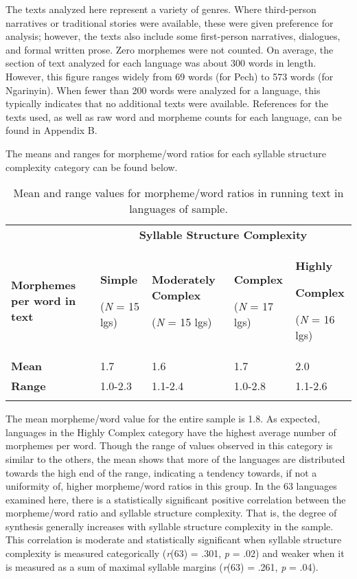   The texts analyzed here represent a variety of genres. Where third-person narratives or traditional stories were available, these were given preference for analysis; however, the texts also include some first-person narratives, dialogues, and formal written prose. Zero morphemes were not counted. On average, the section of text analyzed for each language was about 300 words in length. However, this figure ranges widely from 69 words (for Pech) to 573 words (for Ngarinyin). When fewer than 200 words were analyzed for a language, this typically indicates that no additional texts were available. References for the texts used, as well as raw word and morpheme counts for each language, can be found in Appendix B.

  The means and ranges for morpheme/word ratios for each syllable structure complexity category can be found below.

\begin{table}
\begin{tabularx}{\textwidth}{XXXXX}
\lsptoprule
 & \multicolumn{4}{c}{ \textbf{Syllable Structure Complexity}}\\
 \textbf{Morphemes per word in text} & { \textbf{Simple}}

 (\textit{N} = 15 lgs) & { \textbf{Moderately Complex}}

 (\textit{N} = 15 lgs) & { \textbf{Complex}}

 (\textit{N} = 17 lgs) & { \textbf{Highly} }

{ \textbf{Complex}}

 (\textit{N} = 16 lgs)\\
 \textbf{Mean} & 1.7 & 1.6 & 1.7 & 2.0\\
 \textbf{Range} & 1.0-2.3 & 1.1-2.4 & 1.0-2.8 & 1.1-2.6\\
\lspbottomrule
\end{tabularx}
\caption{\label{tab:8.1}Mean and range values for morpheme/word ratios in running text in languages of sample.}
\end{table}

  The mean morpheme/word value for the entire sample is 1.8. As expected, languages in the Highly Complex category have the highest average number of morphemes per word. Though the range of values observed in this category is similar to the others, the mean shows that more of the languages are distributed towards the high end of the range, indicating a tendency towards, if not a uniformity of, higher morpheme/word ratios in this group. In the 63 languages examined here, there is a statistically significant positive correlation between the morpheme/word ratio and syllable structure complexity. That is, the degree of synthesis generally increases with syllable structure complexity in the sample. This correlation is moderate and statistically significant when syllable structure complexity is measured categorically (\textit{r}(63) = .301, \textit{p} = .02) and weaker when it is measured as a sum of maximal syllable margins (\textit{r}(63) = .261, \textit{p} = .04).

